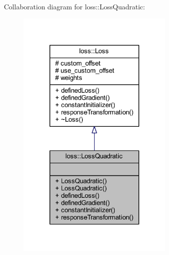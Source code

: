 Collaboration diagram for loss\+:\+:Loss\+Quadratic\+:\nopagebreak
\begin{figure}[H]
\begin{center}
\leavevmode
\includegraphics[width=215pt]{classloss_1_1_loss_quadratic__coll__graph}
\end{center}
\end{figure}
